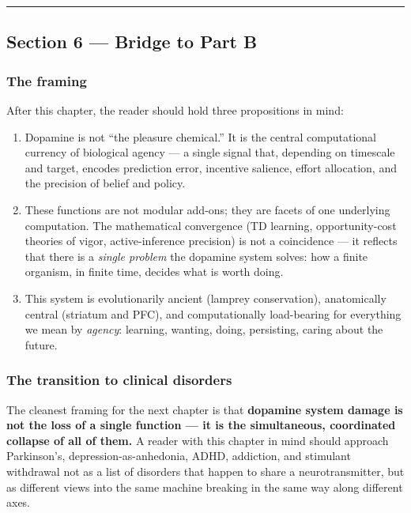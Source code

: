 \begin{center}\rule{0.5\linewidth}{0.5pt}\end{center}

\subsection{Section 6 --- Bridge to Part B}\label{01_dopamine_substrate-section-6-bridge-to-part-b}

\subsubsection{The framing}\label{01_dopamine_substrate-the-framing}

After this chapter, the reader should hold three propositions in mind:

\begin{enumerate}
\def\labelenumi{\arabic{enumi}.}
\tightlist
\item
  Dopamine is not ``the pleasure chemical.'' It is the central computational currency of biological agency --- a single signal that, depending on timescale and target, encodes prediction error, incentive salience, effort allocation, and the precision of belief and policy.
\item
  These functions are not modular add-ons; they are facets of one underlying computation. The mathematical convergence (TD learning, opportunity-cost theories of vigor, active-inference precision) is not a coincidence --- it reflects that there is a \emph{single problem} the dopamine system solves: how a finite organism, in finite time, decides what is worth doing.
\item
  This system is evolutionarily ancient (lamprey conservation), anatomically central (striatum and PFC), and computationally load-bearing for everything we mean by \emph{agency}: learning, wanting, doing, persisting, caring about the future.
\end{enumerate}

\subsubsection{The transition to clinical disorders}\label{01_dopamine_substrate-the-transition-to-clinical-disorders}

The cleanest framing for the next chapter is that \textbf{dopamine system damage is not the loss of a single function --- it is the simultaneous, coordinated collapse of all of them.} A reader with this chapter in mind should approach Parkinson's, depression-as-anhedonia, ADHD, addiction, and stimulant withdrawal not as a list of disorders that happen to share a neurotransmitter, but as different views into the same machine breaking in the same way along different axes.


